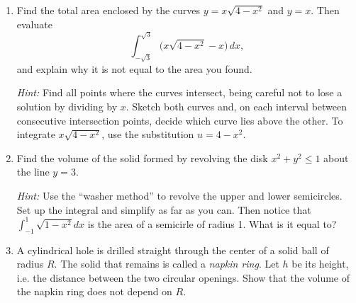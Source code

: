 \documentclass[12pt,letterpaper]{article}
\begin{document}
\begin{enumerate}[label=\textbf{\arabic*.},leftmargin=2em,itemsep=1.25em]
  \item Find the total area enclosed by the curves $y=x\sqrt{4-x^2}$ and
    $y=x$. Then evaluate
    \[
      \int_{-\sqrt{3}}^{\sqrt{3}}\bigl(x\sqrt{4-x^2}-x\bigr)\,dx,
    \]
    and explain why it is not equal to the area you found.

    \emph{Hint:} Find all points where the curves intersect, being careful
    not to lose a solution by dividing by $x$. Sketch both curves and, on
    each interval between consecutive intersection points, decide which curve
    lies above the other. To integrate $x\sqrt{4-x^2}$, use the substitution
    $u=4-x^2$.

  \item Find the volume of the solid formed by revolving the disk
    $x^2+y^2\le 1$ about the line $y=3$.

    \emph{Hint:} Use the ``washer method'' to revolve the upper and lower 
    semicircles. Set up the integral and simplify as far as you can. Then 
    notice that \(\int_{-1}^1 \sqrt{1-x^2} dx\) is the area of a 
    semicirle of radius 1. What is it equal to?

  \item A cylindrical hole is drilled straight through the center of a solid
    ball of radius $R$. The solid that remains is called a \emph{napkin ring}.
    Let $h$ be its height, i.e. the distance between the two circular openings. 
    Show that the volume of the napkin ring does not depend on $R$.


\end{enumerate}
\end{document}
